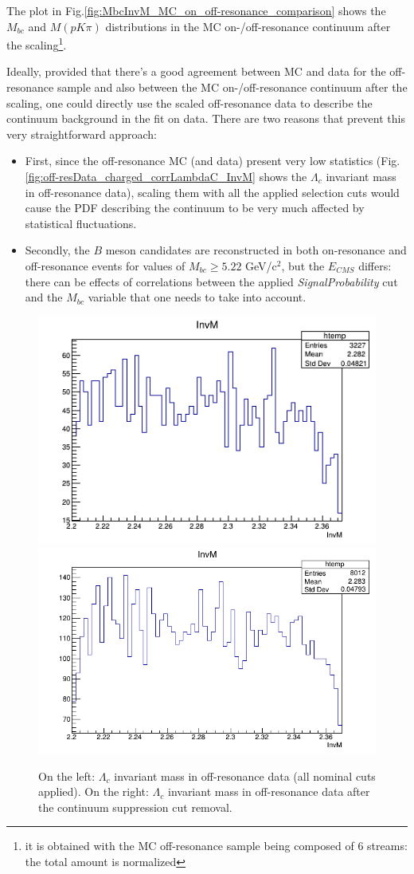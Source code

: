 \noindent The plot in Fig.\ref{fig:MbcInvM_MC_on_off-resonance_comparison} shows the $M_{bc}$ and $M(p K \pi)$ distributions in the MC on-/off-resonance continuum after the scaling\footnote{it is obtained with the MC off-resonance sample being composed of 6 streams: the total amount is normalized}.

Ideally, provided that there's a good agreement between MC and data for the off-resonance sample and also between the MC  on-/off-resonance continuum after the scaling, one could directly use the scaled off-resonance data to describe the continuum background in the fit on data. There are two reasons that prevent this very straightforward approach:
\begin{itemize}

\item First, since the off-resonance MC (and data) present very low statistics (Fig. \ref{fig:off-resData_charged_corrLambdaC_InvM} shows the  $\Lambda_c$ 
invariant mass in off-resonance data), scaling them with all the applied selection cuts would cause the PDF describing the continuum to be very much affected by statistical fluctuations. 
\item Secondly, the $B$ meson candidates are reconstructed in both on-resonance and off-resonance events for values of $M_{bc} \geq 5.22 $ GeV/c$^2$, but the $E_{CMS}$ differs: there can be effects of correlations between the applied \textit{SignalProbability} cut and the $M_{bc}$ variable that one needs to take into account. %
\end{itemize}

\begin{figure}[H]
\centering
\subcaptionbox{\label{fig:off-resData_charged_corrLambdaC_InvM}}
{\includegraphics[width=.46\textwidth]{04-chargedCorrBtoLambda/figs/chargedCorrLambdaC_off-resData.png}}\quad
\subcaptionbox{\label{fig:off-resData_charged_corrLambdaC_InvM_woCS}}
{\includegraphics[width=.48\textwidth]{04-chargedCorrBtoLambda/figs/chargedCorrLambdaC_off-resData_woCScuts.png}} \quad
\caption{On the left: $\Lambda_c$ invariant mass in off-resonance data (all nominal cuts applied). On the right: $\Lambda_c$ invariant mass in off-resonance data after the continuum suppression cut removal.}
\end{figure}



